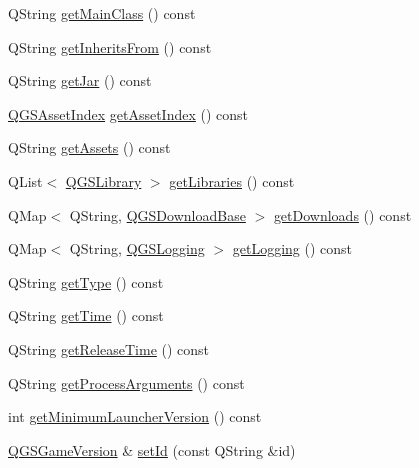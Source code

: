 \begin{DoxyCompactItemize}
\item 
Q\+String \mbox{\hyperlink{class_q_g_s_game_version_aa6b7186482d71dcbee9b99e712deb009}{get\+Main\+Class}} () const
\item 
Q\+String \mbox{\hyperlink{class_q_g_s_game_version_aa70251a12d233e899ee3762476a0f6a3}{get\+Inherits\+From}} () const
\item 
Q\+String \mbox{\hyperlink{class_q_g_s_game_version_ad4faf6f36fe3f85b80d61cffc4e5ed86}{get\+Jar}} () const
\item 
\mbox{\hyperlink{class_q_g_s_asset_index}{Q\+G\+S\+Asset\+Index}} \mbox{\hyperlink{class_q_g_s_game_version_a152ee1e41ab25d1b0f56ef9b12119d62}{get\+Asset\+Index}} () const
\item 
Q\+String \mbox{\hyperlink{class_q_g_s_game_version_a783ed570087b9ad13709634cc587b1c4}{get\+Assets}} () const
\item 
Q\+List$<$ \mbox{\hyperlink{class_q_g_s_library}{Q\+G\+S\+Library}} $>$ \mbox{\hyperlink{class_q_g_s_game_version_aed093b083f3fb48c998f310440292160}{get\+Libraries}} () const
\item 
Q\+Map$<$ Q\+String, \mbox{\hyperlink{class_q_g_s_download_base}{Q\+G\+S\+Download\+Base}} $>$ \mbox{\hyperlink{class_q_g_s_game_version_a34e01e5caa3cf9fffd5647ce096800ec}{get\+Downloads}} () const
\item 
Q\+Map$<$ Q\+String, \mbox{\hyperlink{class_q_g_s_logging}{Q\+G\+S\+Logging}} $>$ \mbox{\hyperlink{class_q_g_s_game_version_a3b24c72e9c8952916962e5f4898c84b9}{get\+Logging}} () const
\item 
Q\+String \mbox{\hyperlink{class_q_g_s_game_version_a1abab1e471d3b73a1f2fd8d06eaeddb5}{get\+Type}} () const
\item 
Q\+String \mbox{\hyperlink{class_q_g_s_game_version_a75295a6b6d7b8d28bd048e18924c56ad}{get\+Time}} () const
\item 
Q\+String \mbox{\hyperlink{class_q_g_s_game_version_a8c62c0e94d34b221198f3a77b2425da8}{get\+Release\+Time}} () const
\item 
Q\+String \mbox{\hyperlink{class_q_g_s_game_version_a630eb4b0ac8b01a0b539e4a2a02e9c56}{get\+Process\+Arguments}} () const
\item 
int \mbox{\hyperlink{class_q_g_s_game_version_ac73e93404f614548a52cca08a80d4683}{get\+Minimum\+Launcher\+Version}} () const
\item 
\mbox{\hyperlink{class_q_g_s_game_version}{Q\+G\+S\+Game\+Version}} \& \mbox{\hyperlink{class_q_g_s_game_version_a414a6ff4753162493d40c3f2953c0a65}{set\+Id}} (const Q\+String \&id)
\item 

\end{DoxyCompactItemize}
